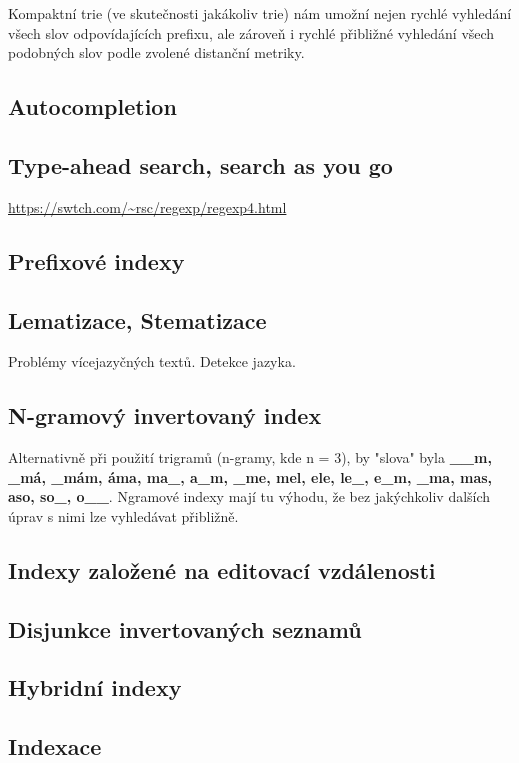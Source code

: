 \documentclass[12pt]{article}
\begin{document}
Kompaktní trie (ve skutečnosti jakákoliv trie) nám umožní nejen rychlé
vyhledání všech slov odpovídajících prefixu, ale zároveň i rychlé přibližné
vyhledání všech podobných slov podle zvolené distanční metriky.


\subsection{Autocompletion}

\subsection{Type-ahead search, search as you go}

\url{https://swtch.com/~rsc/regexp/regexp4.html}
\subsection{Prefixové indexy}

\subsection{Lematizace, Stematizace}
Problémy vícejazyčných textů. Detekce jazyka.

\subsection{N-gramový invertovaný index}
Alternativně při použití trigramů (n-gramy, kde n = 3), by "slova" byla
\textbf{\_\_m, \_má, \_mám, áma, ma\_, a\_m, \_me, mel, ele, le\_, e\_m, \_ma,
mas, aso, so\_, o\_\_}. Ngramové indexy mají tu výhodu, že bez jakýchkoliv
dalších úprav s nimi lze vyhledávat přibližně. 

\subsection{Indexy založené na editovací vzdálenosti}

\subsection{Disjunkce invertovaných seznamů}
\subsection{Hybridní indexy}
\subsection{Indexace}
\end{document}
